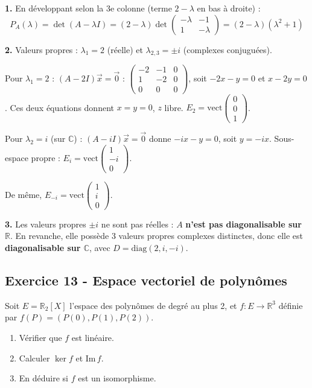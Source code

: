 \documentclass[12pt,a4paper]{article}
\begin{document}
\begin{boitecorrige}
\textbf{1.} En développant selon la 3e colonne (terme $2-\lambda$ en bas à droite) :
\[
P_A(\lambda) = \det(A-\lambda I) = (2-\lambda)\det\begin{pmatrix}-\lambda&-1\\1&-\lambda\end{pmatrix}
= (2-\lambda)(\lambda^2+1)
\]

\textbf{2.} Valeurs propres : $\lambda_1 = 2$ (réelle) et $\lambda_{2,3} = \pm i$ (complexes conjuguées).

Pour $\lambda_1 = 2$ : $(A-2I)\vec{x}=\vec{0}$ : $\begin{pmatrix}-2&-1&0\\1&-2&0\\0&0&0\end{pmatrix}$, soit $-2x-y=0$ et $x-2y=0$. Ces deux équations donnent $x=y=0$, $z$ libre. $E_2 = \text{vect}\begin{pmatrix}0\\0\\1\end{pmatrix}$.

Pour $\lambda_2 = i$ (sur $\mathbb{C}$) : $(A-iI)\vec{x}=\vec{0}$ donne $-ix-y=0$, soit $y=-ix$. Sous-espace propre : $E_i = \text{vect}\begin{pmatrix}1\\-i\\0\end{pmatrix}$.

De même, $E_{-i} = \text{vect}\begin{pmatrix}1\\i\\0\end{pmatrix}$.

\textbf{3.} Les valeurs propres $\pm i$ ne sont pas réelles : $A$ \textbf{n'est pas diagonalisable sur $\mathbb{R}$}. En revanche, elle possède 3 valeurs propres complexes distinctes, donc elle est \textbf{diagonalisable sur $\mathbb{C}$}, avec $D = \text{diag}(2, i, -i)$.
\end{boitecorrige}

\subsection*{Exercice 13 - Espace vectoriel de polynômes \niveau{\moyen}}

\begin{boiteexercice}
Soit $E = \mathbb{R}_2[X]$ l'espace des polynômes de degré au plus 2, et $f : E \to \mathbb{R}^3$ définie par $f(P) = (P(0), P(1), P(2))$.
\begin{enumerate}
  \item Vérifier que $f$ est linéaire.
  \item Calculer $\ker f$ et $\text{Im}\, f$.
  \item En déduire si $f$ est un isomorphisme.
\end{enumerate}
\end{boiteexercice}
\end{document}

